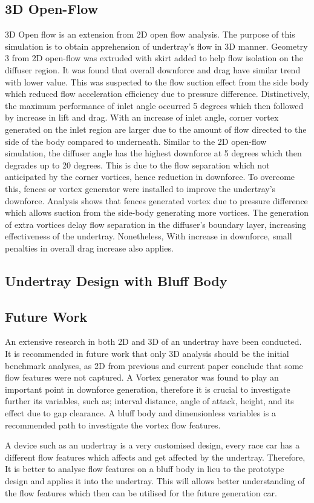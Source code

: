 \subsection*{3D Open-Flow}
3D Open flow is an extension from 2D open flow analysis. The purpose of this simulation is to obtain apprehension of undertray's flow in 3D manner. Geometry 3 from 2D open-flow was extruded with skirt added to help flow isolation on the diffuser region. It was found that overall downforce and drag have similar trend with lower value. This was suspected to the flow suction effect from the side body which reduced flow acceleration efficiency due to pressure difference. Distinctively, the maximum performance of inlet angle occurred 5 degrees which then followed by increase in lift and drag. With an increase of inlet angle, corner vortex generated on the inlet region are larger due to the amount of flow directed to the side of the body compared to underneath. Similar to the 2D open-flow simulation, the diffuser angle has the highest downforce at 5 degrees which then degrades up to 20 degrees. This is due to the flow separation which not anticipated by the corner vortices, hence reduction in downforce. To overcome this, fences or vortex generator were installed to improve the undertray's downforce. Analysis shows that fences generated vortex due to pressure difference which allows suction from the side-body generating more vortices. The generation of extra vortices delay flow separation in the diffuser's boundary layer, increasing effectiveness of the undertray. Nonetheless, With increase in downforce, small penalties in overall drag increase also applies.



\subsection*{Undertray Design with Bluff Body}


\subsection{Future Work}
\noindent An extensive research in both 2D and 3D of an undertray have been conducted. It is recommended in future work that only 3D analysis should be the initial benchmark analyses, as 2D from previous and current paper conclude that some flow features were not captured. A Vortex generator was found to play an important point in downforce generation, therefore it is crucial to investigate further its variables, such as; interval distance, angle of attack, height, and its effect due to gap clearance. A bluff body and dimensionless variables is a recommended path to investigate the vortex flow features.

A device such as an undertray is a very customised design, every race car has a different flow features which affects and get affected by the undertray. Therefore, It is better to analyse flow features on a bluff body in lieu to the prototype design and applies it into the undertray. This will allows better understanding of the flow features which then can be utilised for the future generation car.

